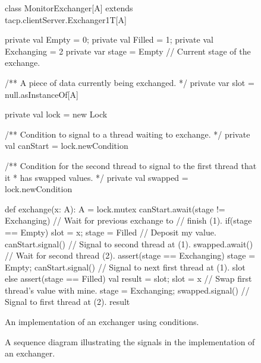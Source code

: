 \begin{figure}
\begin{scala}
class MonitorExchanger[A] extends tacp.clientServer.Exchanger1T[A]{  
  private val Empty = 0; private val Filled = 1; private val Exchanging = 2
  private var stage = Empty // Current stage of the exchange.

  /** A piece of data currently being exchanged. */
  private var slot = null.asInstanceOf[A]

  private val lock = new Lock

  /** Condition to signal to a thread waiting to exchange. */
  private val canStart = lock.newCondition

  /** Condition for the second thread to signal to the first thread that it
    * has swapped values. */
  private val swapped = lock.newCondition

  def exchange(x: A): A = lock.mutex{
    canStart.await(stage != Exchanging) // Wait for previous exchange to
                                     // finish (1).
    if(stage == Empty){
      slot = x; stage = Filled // Deposit my value. 
      canStart.signal() // Signal to second thread at (1).
      swapped.await() // Wait for second thread (2).
      assert(stage == Exchanging)
      stage = Empty; canStart.signal() // Signal to next first thread at (1).
      slot
    }
    else{
      assert(stage == Filled)
      val result = slot; slot = x // Swap first thread's value with mine.
      stage = Exchanging; swapped.signal() // Signal to first thread at (2).
      result
    }
  }
}
\end{scala}
\caption{An implementation of an exchanger using conditions.}
\label{fig:MonitorExchanger}
\end{figure}


\begin{figure}
\begin{center}
\def\height{5.7}
\end{center}
\caption{A sequence diagram illustrating the signals in the implementation of
  an exchanger.}
\label{fig:exchanger-seqDiagram}
\end{figure}

